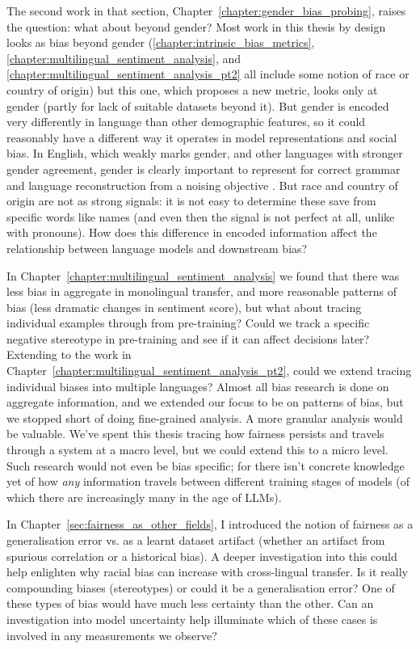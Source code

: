 The second work in that section, Chapter~\ref{chapter:gender_bias_probing}, raises the question: what about beyond gender? Most work in this thesis by design looks as bias beyond gender (\ref{chapter:intrinsic_bias_metrics}, \ref{chapter:multilingual_sentiment_analysis}, and \ref{chapter:multilingual_sentiment_analysis_pt2} all include some notion of race or country of origin) but this one,  which proposes a new metric, looks only at gender (partly for lack of suitable datasets beyond it). But gender is encoded very differently in language than other demographic features, so it could reasonably have a different way it operates in model representations and social bias. In English, which weakly marks gender, and other languages with stronger gender agreement, gender is clearly important to represent for correct grammar and language reconstruction from a noising objective \citep{}. But race and country of origin are not as strong signals: it is not easy to determine these save from specific words like names (and even then the signal is not perfect at all, unlike with pronouns). How does this difference in encoded information affect the relationship between language models and downstream bias?

In Chapter~\ref{chapter:multilingual_sentiment_analysis} we found that there was less bias in aggregate in monolingual transfer, and more reasonable patterns of bias (less dramatic changes in sentiment score), but what about tracing individual examples through from pre-training? Could we track a specific negative stereotype in pre-training and see if it can affect decisions later? Extending to the work in Chapter~\ref{chapter:multilingual_sentiment_analysis_pt2}, could we extend tracing individual biases into multiple languages? Almost all bias research is done on aggregate information, and we extended our focus to be on patterns of bias, but we stopped short of doing fine-grained analysis. A more granular analysis would be valuable. We've spent this thesis tracing how fairness persists and travels through a system at a macro level, but we could extend this to a micro level. Such research would not even be bias specific; for there isn't concrete knowledge yet of how \textit{any} information travels between different training stages of models (of which there are increasingly many in the age of LLMs).

In Chapter~\ref{sec:fairness_as_other_fields}, I introduced the notion of fairness as a generalisation error vs. as a learnt dataset artifact (whether an artifact from spurious correlation or a historical bias). A deeper investigation into this could help enlighten why racial bias can increase with cross-lingual transfer. Is it really compounding biases (stereotypes) or could it be a generalisation error? One of these types of bias would have much less certainty than the other. Can an investigation into model uncertainty help illuminate which of these cases is involved in any measurements we observe?

